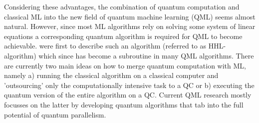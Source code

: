 \documentclass[a4paper]{article}
\newcommand*{\0}{$\ket{0}$}
\newcommand*{\1}{$\ket{1}$}
\begin{document}

Considering these advantages, the combination of quantum computation and classical ML into the new field of quantum machine learning (QML) seems almost natural. However, since most ML algorithms rely on solving some system of linear equations a corresponding quantum algorithm is required for QML to become achievable. \cite{HHL2009} were first to describe such an algorithm (referred to as HHL-algorithm) which since has become a subroutine in many QML algorithms. There are currently two main ideas on how to merge quantum computation with ML, namely a) running the classical algorithm on a classical computer and 'outsourcing' only the computationally intensive task to a QC or b) executing the quantum version of the entire algorithm on a QC. Current QML research mostly focusses on the latter by developing quantum algorithms that tab into the full potential of quantum parallelism.






\end{document}
